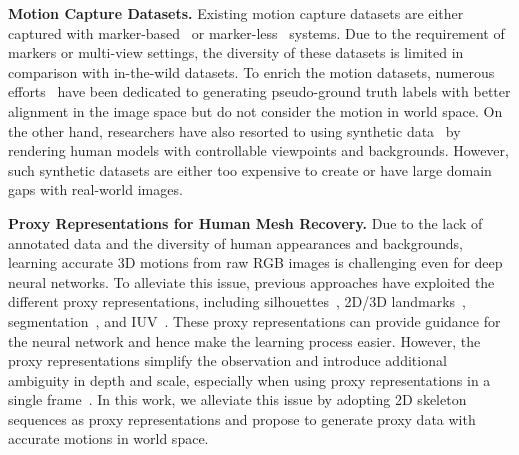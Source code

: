 \documentclass[10pt,twocolumn,letterpaper]{article}
\begin{document}
\textbf{Motion Capture Datasets.} Existing motion capture datasets are either captured with marker-based~\cite{sigal2010humaneva, ionescu2014human3} or marker-less~\cite{peng2021neural, yu2020humbi,zhang20204d,zhang2021lightweight} systems.
Due to the requirement of markers or multi-view settings, the diversity of these datasets is limited in comparison with in-the-wild datasets.
To enrich the motion datasets, numerous efforts~\cite{kolotouros2019learning,joo2021exemplar,moon2020neuralannot,muller2021self, sengupta2020synthetic} have been dedicated to generating pseudo-ground truth labels with better alignment in the image space but do not consider the motion in world space.
On the other hand, researchers have also resorted to using synthetic data~\cite{varol2017learning,su2022virtualpose, patel2021agora} by rendering human models with controllable viewpoints and backgrounds.
However, such synthetic datasets are either too expensive to create or have large domain gaps with real-world images. 


\textbf{Proxy Representations for Human Mesh Recovery.} Due to the lack of annotated data and the diversity of human appearances and backgrounds, learning accurate 3D motions from raw RGB images is challenging even for deep neural networks.
To alleviate this issue, previous approaches have exploited the different proxy representations, including silhouettes~\cite{pavlakos2018learning, varol2018bodynet}, 2D/3D landmarks~\cite{pavlakos2018learning,sun2019human, tung2017self, moon2020i2l, moon2020pose2pose,song2020human,ma20233d,li2021hybrik}, segmentation~\cite{kocabas2021pare, omran2018neural, rueegg2020chained, kocabas2021pare}, and IUV~\cite{zhang2020learning, xu2019denserac}.
These proxy representations can provide guidance for the neural network and hence make the learning process easier.
However, the proxy representations simplify the observation and introduce additional ambiguity in depth and scale, especially when using proxy representations in a single frame~\cite{song2020human,zhang2020learning, xu2019denserac}.
In this work, we alleviate this issue by adopting 2D skeleton sequences as proxy representations and propose to generate proxy data with accurate motions in world space.
\end{document}
